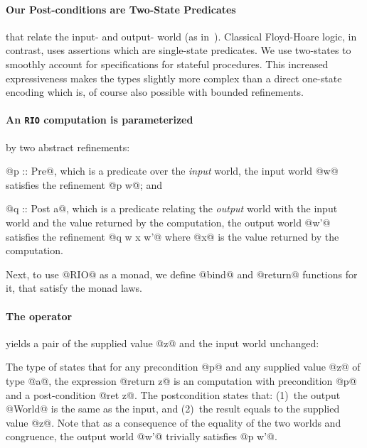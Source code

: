 


\paragraph{Our Post-conditions are Two-State Predicates}
that relate the input- and output- world (as in~\cite{ynot}). 
%
Classical Floyd-Hoare logic, in contrast,
uses assertions which are single-state 
predicates.
%
We use two-states to smoothly account for 
specifications for stateful procedures. 
This increased expressiveness makes the 
types slightly more complex than a direct
one-state encoding which is, of course 
also possible with bounded refinements.


\paragraph{An \texttt{RIO} computation is parameterized} by two 
abstract refinements:
%
\begin{inparaenum}[(1)]
\item @p :: Pre@, which is a predicate over the \emph{input} 
   world, \ie the input world @w@ satisfies the refinement 
   @p w@; and
%
\item @q :: Post a@, which is a predicate relating the 
   \emph{output} world with the input world and the 
   value returned by the computation, \ie the output 
   world @w'@ satisfies the refinement @q w x w'@ where 
   @x@ is the value returned by the computation.
\end{inparaenum}
% 
Next, to use @RIO@ as a monad, we define @bind@ and 
@return@ functions for it, that satisfy the monad laws.
  
\paragraph{The \return operator} yields a pair of the 
supplied value @z@ and the input world unchanged:
%
The type of \return states that for any 
precondition @p@ and any supplied value 
@z@ of type @a@, the expression @return z@ 
is an \RIO computation with precondition
@p@ and a post-condition @ret z@.
The postcondition states that: 
%
(1)~the output @World@ is the same as the input, and 
%
(2)~the result equals to the supplied value @z@.
%
Note that as a consequence of the equality of the two worlds
and congruence, the output world @w'@ trivially satisfies @p w'@.
%
 
